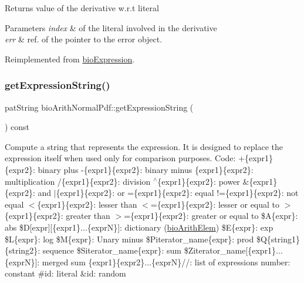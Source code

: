 \begin{DoxyReturn}{Returns}
value of the derivative w.\+r.\+t literal 
\end{DoxyReturn}

\begin{DoxyParams}{Parameters}
{\em index} & of the literal involved in the derivative \\
\hline
{\em err} & ref. of the pointer to the error object. \\
\hline
\end{DoxyParams}


Reimplemented from \hyperlink{classbio_expression_a5915579d1193f25f216c1e273c97f2ce}{bio\+Expression}.

\mbox{\label{classbio_arith_normal_pdf_af63b696ee818be0597345caf08d0b3d1}} 
\subsubsection{\texorpdfstring{get\+Expression\+String()}{getExpressionString()}}
{\footnotesize\ttfamily pat\+String bio\+Arith\+Normal\+Pdf\+::get\+Expression\+String (\begin{DoxyParamCaption}{ }\end{DoxyParamCaption}) const\hspace{0.3cm}{\ttfamily [virtual]}}

Compute a string that represents the expression. It is designed to replace the expression itself when used only for comparison purposes. Code\+: +\{expr1\}\{expr2\}\+: binary plus -\/\{expr1\}\{expr2\}\+: binary minus \{expr1\}\{expr2\}\+: multiplication /\{expr1\}\{expr2\}\+: division $^\wedge$\{expr1\}\{expr2\}\+: power \&\{expr1\}\{expr2\}\+: and $\vert$\{expr1\}\{expr2\}\+: or =\{expr1\}\{expr2\}\+: equal !=\{expr1\}\{expr2\}\+: not equal $<$\{expr1\}\{expr2\}\+: lesser than $<$=\{expr1\}\{expr2\}\+: lesser or equal to $>$\{expr1\}\{expr2\}\+: greater than $>$=\{expr1\}\{expr2\}\+: greater or equal to \$A\{expr\}\+: abs \$D\mbox{[}expr\mbox{]}\mbox{[}\{expr1\}...\{exprN\}\mbox{]}\+: dictionary (\hyperlink{classbio_arith_elem}{bio\+Arith\+Elem}) \$E\{expr\}\+: exp \$L\{expr\}\+: log \$M\{expr\}\+: Unary minus \$\+Piterator\+\_\+name\{expr\}\+: prod \$Q\{string1\}\{string2\}\+: sequence \$\+Siterator\+\_\+name\{expr\}\+: sum \$\+Ziterator\+\_\+name\mbox{[}\{expr1\}...\{exprN\}\mbox{]}\+: merged sum \{expr1\}\{expr2\}...\{exprN\}//\+: list of expressions number\+: constant \#id\+: literal \&id\+: random 

